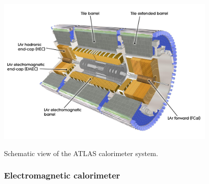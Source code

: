 \bfig[t!]
\centering
\includegraphics[width=0.8\textwidth]{figures/Detector/calo_all}
\captionsetup{width=0.85\textwidth} \caption{\small Schematic view of the ATLAS calorimeter system.}
\label{sec:det:fig:ATLASCALO}
\efig

\subsubsection{Electromagnetic calorimeter}

